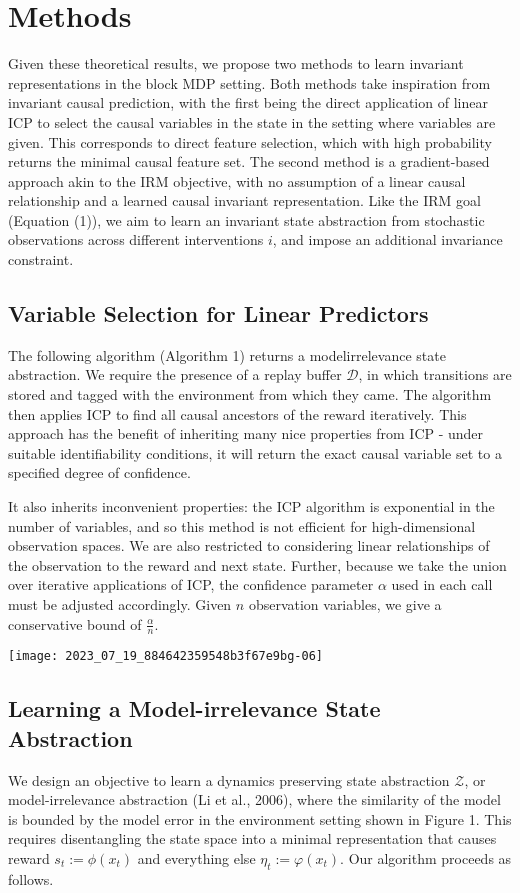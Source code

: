 \documentclass[10pt]{article}
\begin{document}
\section{Methods}
Given these theoretical results, we propose two methods to learn invariant representations in the block MDP setting. Both methods take inspiration from invariant causal prediction, with the first being the direct application of linear ICP to select the causal variables in the state in the setting where variables are given. This corresponds to direct feature selection, which with high probability returns the minimal causal feature set. The second method is a gradient-based approach akin to the IRM objective, with no assumption of a linear causal relationship and a learned causal invariant representation. Like the IRM goal (Equation (1)), we aim to learn an invariant state abstraction from stochastic observations across different interventions $i$, and impose an additional invariance constraint.

\subsection{Variable Selection for Linear Predictors}
The following algorithm (Algorithm 1) returns a modelirrelevance state abstraction. We require the presence of a replay buffer $\mathcal{D}$, in which transitions are stored and tagged with the environment from which they came. The algorithm then applies ICP to find all causal ancestors of the reward iteratively. This approach has the benefit of inheriting many nice properties from ICP - under suitable identifiability conditions, it will return the exact causal variable set to a specified degree of confidence.

It also inherits inconvenient properties: the ICP algorithm is exponential in the number of variables, and so this method is not efficient for high-dimensional observation spaces. We are also restricted to considering linear relationships of the observation to the reward and next state. Further, because we take the union over iterative applications of ICP, the confidence parameter $\alpha$ used in each call must be adjusted accordingly. Given $n$ observation variables, we give a conservative bound of $\frac{\alpha}{n}$.

\begin{center}
\texttt{[image: 2023\_07\_19\_884642359548b3f67e9bg-06]}
\end{center}

\subsection{Learning a Model-irrelevance State Abstraction}
We design an objective to learn a dynamics preserving state abstraction $\mathcal{Z}$, or model-irrelevance abstraction (Li et al., 2006), where the similarity of the model is bounded by the model error in the environment setting shown in Figure 1. This requires disentangling the state space into a minimal representation that causes reward $s_{t}:=\phi\left(x_{t}\right)$ and everything else $\eta_{t}:=\varphi\left(x_{t}\right)$. Our algorithm proceeds as follows.
\end{document}
